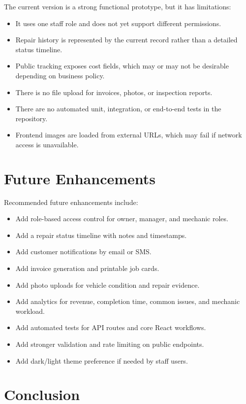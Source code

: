 \documentclass[12pt,a4paper]{report}
\begin{document}
The current version is a strong functional prototype, but it has limitations:

\begin{itemize}
  \item It uses one staff role and does not yet support different permissions.
  \item Repair history is represented by the current record rather than a detailed status timeline.
  \item Public tracking exposes cost fields, which may or may not be desirable depending on business policy.
  \item There is no file upload for invoices, photos, or inspection reports.
  \item There are no automated unit, integration, or end-to-end tests in the repository.
  \item Frontend images are loaded from external URLs, which may fail if network access is unavailable.
\end{itemize}

\chapter{Future Enhancements}

Recommended future enhancements include:

\begin{itemize}
  \item Add role-based access control for owner, manager, and mechanic roles.
  \item Add a repair status timeline with notes and timestamps.
  \item Add customer notifications by email or SMS.
  \item Add invoice generation and printable job cards.
  \item Add photo uploads for vehicle condition and repair evidence.
  \item Add analytics for revenue, completion time, common issues, and mechanic workload.
  \item Add automated tests for API routes and core React workflows.
  \item Add stronger validation and rate limiting on public endpoints.
  \item Add dark/light theme preference if needed by staff users.
\end{itemize}

\chapter{Conclusion}
\end{document}
